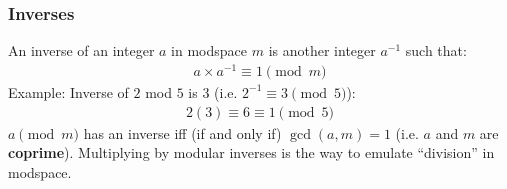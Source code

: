 \documentclass{beamer}
\begin{document}
\begin{frame}
    \frametitle{Inverses}
    An inverse of an integer $a$ in modspace $m$ is another integer $a^{-1}$ such that:
    \begin{gather*}
        a\times a^{-1}\equiv 1\pmod m
    \end{gather*}
    Example: Inverse of $2$ mod $5$ is $3$ (i.e. $2^{-1}\equiv 3\pmod 5$):
    \begin{gather*}
        2(3)\equiv 6\equiv 1\pmod 5
    \end{gather*}
    $a\pmod m$ has an inverse iff (if and only if) $\gcd(a,m)=1$ (i.e. $a$ and $m$ are {\bf coprime}). Multiplying by modular inverses is the way to emulate ``division'' in modspace.
\end{frame}
\end{document}

